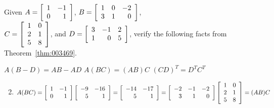 \begin{multicols}{2}
\begin{ex}
Given $A = \left[ \begin{array}{rr}
1 & -1 \\
0 & 1
\end{array} \right]$, $B = \left[ \begin{array}{rrr}
1 & 0 & -2 \\
3 & 1 & 0
\end{array} \right]$, \\ $C = \left[ \begin{array}{rr}
1 & 0 \\
2 & 1 \\
5 & 8
\end{array} \right]$, and $D = \left[ \begin{array}{rrr}
 3 & -1 & 2 \\
 1 & 0 & 5
 \end{array} \right]$, verify the \newline following facts from Theorem~\ref{thm:003469}.
\begin{exenumerate}
\exitem $A(B - D) = AB - AD$
\exitem $A(BC) = (AB)C$
\exitem $(CD)^{T} = D^{T}C^{T}$
\end{exenumerate}
\begin{sol}
\begin{enumerate}[label={\alph*.}]
\setcounter{enumi}{1}
\item
$
A(BC) = \left[ \begin{array}{rr}
1 & -1 \\
0 & 1
\end{array} \right] \left[ \begin{array}{rr}
-9 & -16 \\
5 & 1
\end{array} \right] = \left[ \begin{array}{rr}
-14 & -17 \\
5 & 1
\end{array} \right] = \left[ \begin{array}{rrr}
-2 & -1 & -2 \\
3 & 1 & 0
\end{array} \right] \left[ \begin{array}{rr}
1 & 0 \\
2 & 1 \\
5 & 8
\end{array} \right] = (AB)C
$

\end{enumerate}
\end{sol}
\end{ex}


\end{multicols}
